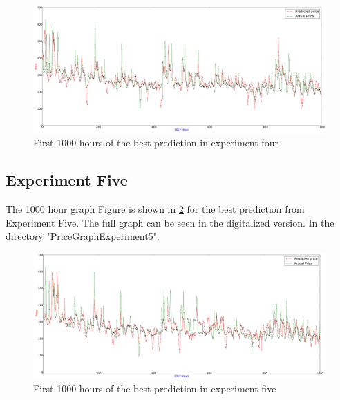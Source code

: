 \begin{figure}
\centering
\includegraphics[width=\linewidth]{billeder/PriceGraphs/Experiment4.png}
\caption{First 1000 hours of the best prediction in experiment four}
\label{fig:fullPageExperiment4}
\end{figure}


\subsection{Experiment Five}
The 1000 hour graph Figure is shown in \ref{fig:fullPageExperiment5} for the best prediction from Experiment Five. The full graph can be seen in the digitalized version. In the directory "PriceGraphExperiment5".

\begin{figure}
\centering
\includegraphics[width=\linewidth]{billeder/PriceGraphs/Experiment5.png}
\caption{First 1000 hours of the best prediction in experiment five}
\label{fig:fullPageExperiment5}
\end{figure}